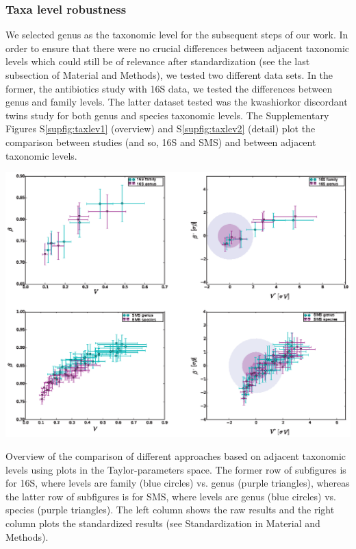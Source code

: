 \subsubsection*{Taxa level robustness}
We selected genus as the taxonomic level for the subsequent steps of our work. In order to ensure that there were no crucial differences between adjacent taxonomic levels which could still be of relevance after standardization (see the last subsection of Material and Methods), we tested two different data sets. In the former, the antibiotics study\cite{antibiotic} with 16S data, we tested the differences between genus and family levels. The latter dataset tested was the kwashiorkor discordant twins study\cite{kwashiorkor} for both genus and species taxonomic levels. The Supplementary Figures S\ref{supfig:taxlev1} (overview) and S\ref{supfig:taxlev2} (detail) plot the comparison between studies (and so, 16S and SMS) and between adjacent taxonomic levels.

\begin{supfig} 
  \includegraphics[width=1.0\textwidth]{figs/supfig_taxlev1.eps}
\caption{Overview of the comparison of different approaches based on adjacent taxonomic levels using plots in the Taylor-parameters space. The former row of subfigures is for 16S, where levels are family (blue circles) vs. genus (purple triangles), whereas the latter row of subfigures is for SMS, where levels are genus (blue circles) vs. species (purple triangles). The left column shows the raw results and the right column plots the standardized results (see Standardization in Material and Methods).}
\label{supfig:taxlev1}
\end{supfig}


